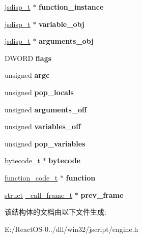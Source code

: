 \begin{DoxyCompactItemize}
\hyperlink{structjsdisp__t}{jsdisp\+\_\+t} $\ast$ {\bfseries function\+\_\+instance}
\item 
\mbox{\label{struct__call__frame__t_a7d2da935a24e0eae0951315317e5b87b}} 
\hyperlink{structjsdisp__t}{jsdisp\+\_\+t} $\ast$ {\bfseries variable\+\_\+obj}
\item 
\mbox{\label{struct__call__frame__t_a5a1efd5d7c8c52b6cd001c7ae7f63e3a}} 
\hyperlink{structjsdisp__t}{jsdisp\+\_\+t} $\ast$ {\bfseries arguments\+\_\+obj}
\item 
\mbox{\label{struct__call__frame__t_ac67332d7a3e063a1d8504807401c8256}} 
D\+W\+O\+RD {\bfseries flags}
\item 
\mbox{\label{struct__call__frame__t_a462de3840654c886036e8f63664d8184}} 
unsigned {\bfseries argc}
\item 
\mbox{\label{struct__call__frame__t_a46af1478921f5617854fcb986bb340d8}} 
unsigned {\bfseries pop\+\_\+locals}
\item 
\mbox{\label{struct__call__frame__t_ab3dab4e9a9758aa76ec3a2ce2881827e}} 
unsigned {\bfseries arguments\+\_\+off}
\item 
\mbox{\label{struct__call__frame__t_a3a2f0334b0790a8af4c1dcbdbb4d6b2b}} 
unsigned {\bfseries variables\+\_\+off}
\item 
\mbox{\label{struct__call__frame__t_ae92b68f54b96a6f1f92bb845d638b1b8}} 
unsigned {\bfseries pop\+\_\+variables}
\item 
\mbox{\label{struct__call__frame__t_a97b61d59ad13b18a58517090639ed868}} 
\hyperlink{struct__bytecode__t}{bytecode\+\_\+t} $\ast$ {\bfseries bytecode}
\item 
\mbox{\label{struct__call__frame__t_a80324627b83b3e66baff1a4efe34d0a8}} 
\hyperlink{struct__function__code__t}{function\+\_\+code\+\_\+t} $\ast$ {\bfseries function}
\item 
\mbox{\label{struct__call__frame__t_a25db62bd79651c53613c1b8461a2d0ed}} 
\hyperlink{interfacestruct}{struct} \hyperlink{struct__call__frame__t}{\+\_\+call\+\_\+frame\+\_\+t} $\ast$ {\bfseries prev\+\_\+frame}
\end{DoxyCompactItemize}


该结构体的文档由以下文件生成\+:\begin{DoxyCompactItemize}
\item 
E\+:/\+React\+O\+S-\/0../dll/win32/jscript/engine.\+h\end{DoxyCompactItemize}
